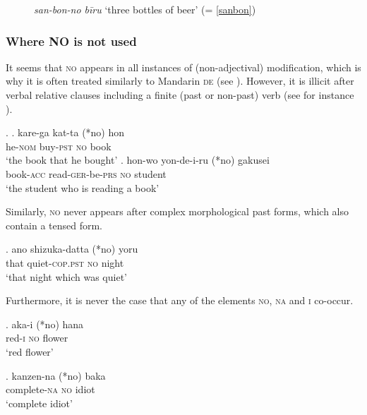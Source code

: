 \begin{figure}
\centering
{}
\caption{\textit{san-bon-no bīru} `three bottles of beer’ (= \ref{sanbon})}
\label{Structure Sanbon-no}
\end{figure}

\subsubsection{Where \textsc{NO} is not used} \label{no no}

It seems that \textsc{no} appears in all instances of (non-adjectival) modification, which is why it is often treated similarly to Mandarin \textsc{de} (see \citealt{saito:2008:N}). However, it is illicit after verbal relative clauses including a finite (past or non-past) verb (see for instance \citealt{murasugi:1991:noun, saito:2008:N}).

\ex. \ag. kare-ga kat-ta (*no) hon\\
he-\textsc{nom} buy-\textsc{pst} \textsc{no} book\\
`the book that he bought’
\bg. hon-wo yon-de-i-ru (*no) gakusei\\
book-\textsc{acc} read-\textsc{ger}-be-\textsc{prs} \textsc{no} student\\
`the student who is reading a book’

Similarly, \textsc{no} never appears after complex morphological past forms, which also contain a tensed form.

\exg. ano shizuka-datta (*no) yoru\\
that quiet-\textsc{cop.pst} \textsc{no} night\\
`that night which was quiet’

Furthermore, it is never the case that any of the elements \textsc{no}, \textsc{na} and \textsc{i} co-occur.

\exg. aka-i (*no) hana\\
red-\textsc{i} \textsc{no} flower\\
`red flower'

\exg. kanzen-na (*no) baka\\
complete-\textsc{na} \textsc{no} idiot\\
`complete idiot'


